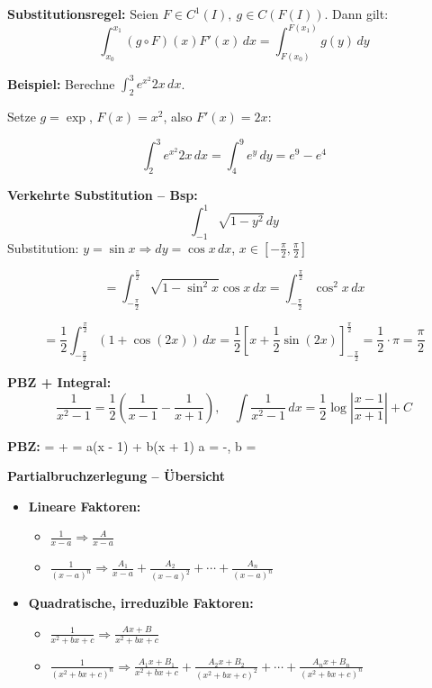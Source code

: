 \textbf{Substitutionsregel:} Seien $F \in C^1(I),\ g \in C(F(I))$. Dann gilt:
\[
\int_{x_0}^{x_1} (g \circ F)(x) F'(x)\, dx = \int_{F(x_0)}^{F(x_1)} g(y)\, dy
\]

\textbf{Beispiel:} Berechne $\int_2^3 e^{x^2} 2x \, dx$.

Setze $g = \exp$, $F(x) = x^2$, also $F'(x) = 2x$:

\[
\int_2^3 e^{x^2} 2x\, dx = \int_{4}^{9} e^y\, dy = e^9 - e^4
\]

\textbf{Verkehrte Substitution – Bsp:}
\[
\int_{-1}^{1} \sqrt{1 - y^2} \, dy
\]
Substitution: \( y = \sin x \Rightarrow dy = \cos x \, dx \), \( x \in \left[-\tfrac{\pi}{2}, \tfrac{\pi}{2}\right] \)

\[
= \int_{-\frac{\pi}{2}}^{\frac{\pi}{2}} \sqrt{1 - \sin^2 x} \cos x \, dx = \int_{-\frac{\pi}{2}}^{\frac{\pi}{2}} \cos^2 x \, dx
\]

\[
= \frac{1}{2} \int_{-\frac{\pi}{2}}^{\frac{\pi}{2}} (1 + \cos(2x)) \, dx = \frac{1}{2} \left[ x + \frac{1}{2} \sin(2x) \right]_{-\frac{\pi}{2}}^{\frac{\pi}{2}} = \frac{1}{2} \cdot \pi = \frac{\pi}{2}
\]

\textbf{PBZ + Integral:}  
\[
\frac{1}{x^2 - 1} = \frac{1}{2} \left( \frac{1}{x - 1} - \frac{1}{x + 1} \right), \quad
\int \frac{1}{x^2 - 1} \, dx = \frac{1}{2} \log\left| \frac{x - 1}{x + 1} \right| + C
\]

\textbf{PBZ:} \quad
{} =  +  
 = a(x - 1) + b(x + 1) 
\Rightarrow a = -,\; b = 

\textbf{Partialbruchzerlegung – Übersicht}

\begin{itemize}
  \item \textbf{Lineare Faktoren:}
    \begin{itemize}
      \item \( \frac{1}{x - a} \Rightarrow \frac{A}{x - a} \)
      \item \( \frac{1}{(x - a)^n} \Rightarrow \frac{A_1}{x - a} + \frac{A_2}{(x - a)^2} + \cdots + \frac{A_n}{(x - a)^n} \)
    \end{itemize}
    
  \item \textbf{Quadratische, irreduzible Faktoren:}
    \begin{itemize}
      \item \( \frac{1}{x^2 + bx + c} \Rightarrow \frac{Ax + B}{x^2 + bx + c} \)
      \item \( \frac{1}{(x^2 + bx + c)^n} \Rightarrow \frac{A_1x + B_1}{x^2 + bx + c} + \frac{A_2x + B_2}{(x^2 + bx + c)^2} + \cdots + \frac{A_nx + B_n}{(x^2 + bx + c)^n} \)
    \end{itemize}
\end{itemize}

